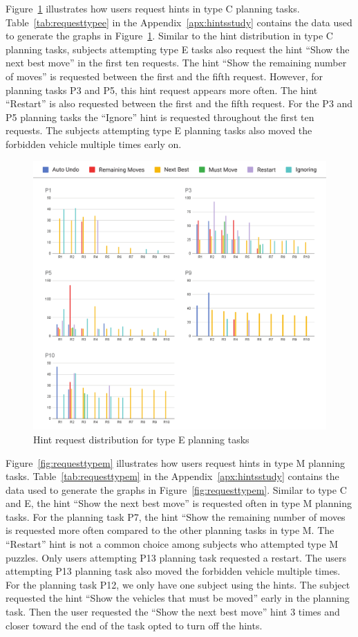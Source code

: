 Figure~\ref{fig:requesttypee} illustrates how users request hints in type C planning tasks.
Table~\ref{tab:requesttypee} in the Appendix~\ref{apx:hintsstudy} contains the data used to generate the graphs in Figure~\ref{fig:requesttypee}.
Similar to the hint distribution in type C planning tasks, subjects attempting type E tasks also request the hint ``Show the next best move'' in the first ten requests.
The hint ``Show the remaining number of moves'' is requested between the first and the fifth request.
However, for planning tasks P3 and P5, this hint request appears more often.
The hint ``Restart'' is also requested between the first and the fifth request.
For the P3 and P5 planning tasks the ``Ignore'' hint is requested throughout the first ten requests.
The subjects attempting type E planning tasks also moved the forbidden vehicle multiple times early on.
\begin{figure}[tpb]
  \centering
\includegraphics[width=\columnwidth]{img/set-3d.pdf}
  \caption{Hint request distribution for type E planning tasks}
  \label{fig:requesttypee}
\end{figure}

Figure~\ref{fig:requesttypem} illustrates how users request hints in type M planning tasks.
Table~\ref{tab:requesttypem} in the Appendix~\ref{apx:hintsstudy} contains the data used to generate the graphs in Figure~\ref{fig:requesttypem}.
Similar to type C and E, the hint ``Show the next best move'' is requested often in type M planning tasks.
For the planning task P7, the hint ``Show the remaining number of moves is requested more often compared to the other planning tasks in type M.
The ``Restart'' hint is not a common choice among subjects who attempted type M puzzles.
Only users attempting P13 planning task requested a restart.
The users attempting P13 planning task also moved the forbidden vehicle multiple times.
For the planning task P12, we only have one subject using the hints.
The subject requested the hint ``Show the vehicles that must be moved'' early in the planning task.
Then the user requested the ``Show the next best move'' hint 3 times and closer toward the end of the task opted to turn off the hints.

